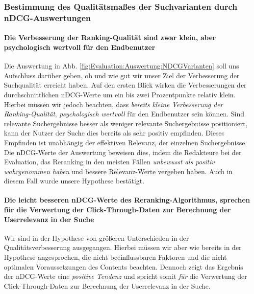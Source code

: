 \subsubsection{Bestimmung des Qualitätsmaßes der Suchvarianten durch nDCG-Auswertungen}
\label{sec:Evaluation:Auswertung:Diskussion:nDCG}

\paragraph{Die Verbesserung der Ranking-Qualität sind zwar klein, aber psychologisch wertvoll für den Endbenutzer} 
Die Auswertung in Abb. \ref{fig:Evaluation:Auswertung:NDCGVarianten} soll uns Aufschluss darüber geben, ob und wie gut wir unser Ziel der Verbesserung der Suchqualität erreicht haben. Auf den ersten Blick wirken die Verbesserungen der durchschnittlichen nDCG-Werte um ein bis zwei Prozentpunkte relativ klein. Hierbei müssen wir jedoch beachten, dass \textit{bereits kleine Verbesserung der Ranking-Qualität}, \textit{psychologisch wertvoll} für den Endbenutzer sein können. Sind relevante Suchergebnisse besser als weniger relevante Suchergebnisse positioniert, kann der Nutzer der Suche dies bereits als sehr positiv empfinden. Dieses Empfinden ist unabhängig der effektiven Relevanz, der einzelnen Suchergebnisse. Die nDCG-Werte der Auswertung beweisen dies, indem die Redakteure bei der Evaluation, das Reranking in den meisten Fällen \textit{unbewusst als positiv wahrgenommen haben} und bessere Relevanz-Werte vergeben haben. Auch in diesem Fall wurde unsere Hypothese bestätigt. 

\paragraph{Die leicht besseren nDCG-Werte des Reranking-Algorithmus, sprechen für die Verwertung der Click-Through-Daten zur Berechnung der Userrelevanz in der Suche} 
Wir sind in der Hypothese von größeren Unterschieden in der Qualitätsverbesserung ausgegangen. Hierbei müssen wir aber wie bereits in der Hypothese angesprochen, die nicht beeinflussbaren Faktoren und die nicht optimalen Voraussetzungen des Contents beachten. Dennoch zeigt das Ergebnis der nDCG-Werte eine \textit{positive Tendenz} und spricht somit \textit{für} die Verwertung der Click-Through-Daten zur Berechnung der Userrelevanz in der Suche.  

